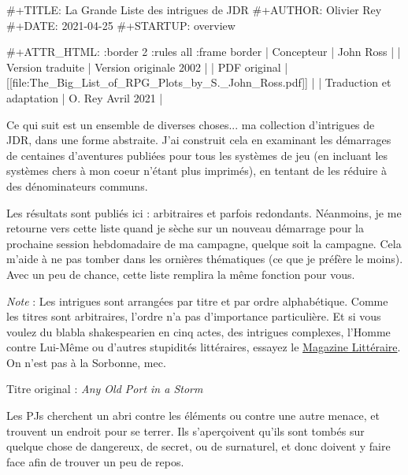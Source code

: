#+TITLE: La Grande Liste des intrigues de JDR
#+AUTHOR: Olivier Rey
#+DATE: 2021-04-25
#+STARTUP: overview

#+ATTR_HTML: :border 2 :rules all :frame border
| Concepteur               | John Ross                                          |
| Version traduite         | Version originale 2002                             |
| PDF original             | [[file:The_Big_List_of_RPG_Plots_by_S._John_Ross.pdf]] |
| Traduction et adaptation | O. Rey Avril 2021                                  |



Ce qui suit est un ensemble de diverses choses... ma collection d'intrigues de JDR, dans une forme abstraite. J'ai construit cela en examinant les démarrages de centaines d'aventures publiées pour tous les systèmes de jeu (en incluant les systèmes chers à mon coeur n'étant plus imprimés), en tentant de les réduire à des dénominateurs communs.

Les résultats sont publiés ici : arbitraires et parfois redondants. Néanmoins, je me retourne vers cette liste quand je sèche sur un nouveau démarrage pour la prochaine session hebdomadaire de ma campagne, quelque soit la campagne. Cela m'aide à ne pas tomber dans les ornières thématiques (ce que je préfère le moins). Avec un peu de chance, cette liste remplira la même fonction pour vous.

\emph{Note} : Les intrigues sont arrangées par titre et par ordre alphabétique. Comme les titres sont arbitraires, l'ordre n'a pas d'importance particulière. Et si vous voulez du blabla shakespearien en cinq actes, des intrigues complexes, l'Homme contre Lui-Même ou d'autres stupidités littéraires, essayez le \href{https://www.writersdigest.com/}{Magazine Littéraire}. On n'est pas à la Sorbonne, mec.

\label{p01}

Titre original : \emph{Any Old Port in a Storm}

Les PJs cherchent un abri contre les éléments ou contre une autre menace, et trouvent un endroit pour se terrer. Ils s'aperçoivent qu'ils sont tombés sur quelque chose de dangereux, de secret, ou de surnaturel, et donc doivent y faire face afin de trouver un peu de repos.

